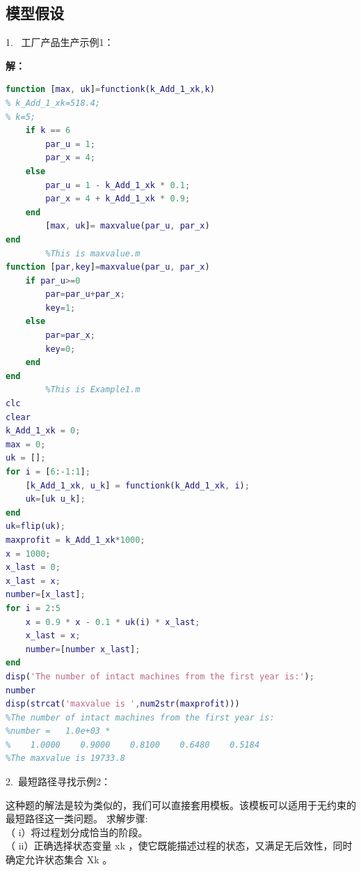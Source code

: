 \documentclass[a4paper,20pt]{article}
\begin{document}
\subsection{模型假设}
1.~ 工厂产品生产示例1：
\par \noindent {}
\par \noindent \textbf{解：}
\begin{center}
    \begin{lstlisting}[caption={Example1},language=Matlab]
        %This is functionk.m
function [max, uk]=functionk(k_Add_1_xk,k)
% k_Add_1_xk=518.4;
% k=5;
    if k == 6
        par_u = 1;
        par_x = 4;
    else
        par_u = 1 - k_Add_1_xk * 0.1;
        par_x = 4 + k_Add_1_xk * 0.9;
    end
        [max, uk]= maxvalue(par_u, par_x)
end
        %This is maxvalue.m
function [par,key]=maxvalue(par_u, par_x)
    if par_u>=0
        par=par_u+par_x;
        key=1;
    else
        par=par_x;
        key=0;
    end
end
        %This is Example1.m
clc
clear
k_Add_1_xk = 0;
max = 0;
uk = [];
for i = [6:-1:1];
    [k_Add_1_xk, u_k] = functionk(k_Add_1_xk, i);
    uk=[uk u_k];
end
uk=flip(uk);
maxprofit = k_Add_1_xk*1000;
x = 1000; 
x_last = 0;
x_last = x;
number=[x_last];
for i = 2:5
    x = 0.9 * x - 0.1 * uk(i) * x_last;
    x_last = x;
    number=[number x_last];
end
disp('The number of intact machines from the first year is:');
number
disp(strcat('maxvalue is ',num2str(maxprofit)))
%The number of intact machines from the first year is:
%number =   1.0e+03 *
%    1.0000    0.9000    0.8100    0.6480    0.5184
%The maxvalue is 19733.8
    \end{lstlisting}
\end{center}
\par 2.~最短路径寻找示例2：
\par \noindent {}
\par 这种题的解法是较为类似的，我们可以直接套用模板。该模板可以适用于无约束的最短路径这一类问题。
求解步骤:
\\（ i）将过程划分成恰当的阶段。
\\（ ii）正确选择状态变量 xk ，使它既能描述过程的状态，又满足无后效性，同时确定允许状态集合 Xk 。
\end{document}
